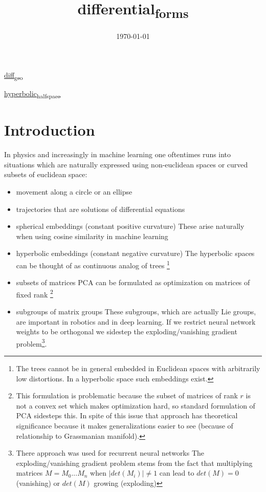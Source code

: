 \documentclass[11pt]{article}
\date{\today}
\title{differential\textsubscript{forms}}
\begin{document}
\maketitle
\tableofcontents

\href{../../shared/org/roam/20230816150914-diff_geo.org}{diff\textsubscript{geo}}

\href{20230905142646-hyperbolic_half_space.org}{hyperbolic\textsubscript{half}\textsubscript{space}}

\section{Introduction}
\label{sec:orgd51c1ec}

In physics and increasingly in machine learning one oftentimes runs into situations which are naturally expressed using non-euclidean spaces or curved subsets of euclidean space:

\begin{itemize}
\item movement along a circle or an ellipse
\item trajectories that are solutions of differential equations
\item spherical embeddings (constant positive curvature)
These arise naturally when using cosine similarity in machine learning
\item hyperbolic embeddings (constant negative curvature)
The  hyperbolic spaces can be thought of as continuous analog of trees \footnote{The trees cannot be in general embedded in Euclidean spaces with arbitrarily low distortions. In a hyperbolic space such embeddings exist\cite{sarkar}.}
\item subsets of matrices
PCA can be formulated as optimization on matrices of fixed rank \footnote{This formulation is problematic because the subset of matrices of rank \(r\) is not a convex set which makes optimization hard, so standard formulation of PCA sidesteps this. In spite of this issue that approach has theoretical significance because it makes generalizations easier to see (because of relationship to Grassmanian manifold).}
\item subgroups of matrix groups
These subgroups, which are actually Lie groups, are important in robotics and in deep learning.
If we restrict neural network weights to be orthogonal we sidestep the exploding/vanishing gradient problem\footnote{There approach was used for recurrent neural networks\cite{kiani22_projun.} The exploding/vanishing gradient problem stems from the fact that multiplying matrices \(M = M_0 ... M_n\) when \(|det(M_i)| \neq 1\) can lead to \(det(M) = 0\) (vanishing) or \(det(M)\) growing (exploding)}.
\end{itemize}
\end{document}
